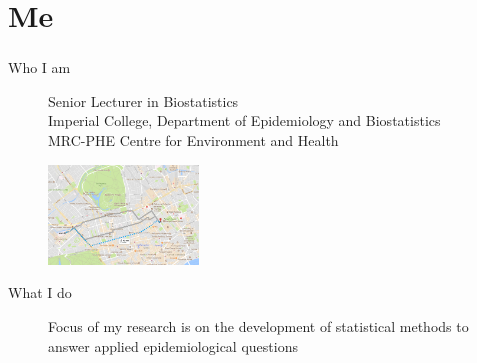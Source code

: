 \documentclass[slidestop,compress,serif,10pt, handout]{beamer}
\begin{document}
\section{Me}
\begin{frame}\frametitle{}
\begin{description}
\item[Who I am] 
Senior Lecturer in Biostatistics\\
Imperial College,
Department of Epidemiology and Biostatistics\\
MRC-PHE Centre for Environment and Health\\
\vspace{4pt}\begin{center}\includegraphics[width=4cm]{WorkMap.png}\end{center}
\item[What I do] Focus of my research is on the development of statistical methods to answer applied epidemiological questions

\end{description}  \end{frame}
\end{document}
